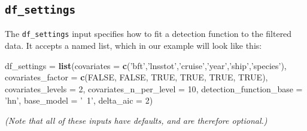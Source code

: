 \documentclass[
]{book}
\newenvironment{Shaded}{\begin{snugshade}}{\end{snugshade}}
\newcommand{\DataTypeTok}[1]{\textcolor[rgb]{0.13,0.29,0.53}{#1}}
\newcommand{\DecValTok}[1]{\textcolor[rgb]{0.00,0.00,0.81}{#1}}
\newcommand{\KeywordTok}[1]{\textcolor[rgb]{0.13,0.29,0.53}{\textbf{#1}}}
\newcommand{\NormalTok}[1]{#1}
\newcommand{\OtherTok}[1]{\textcolor[rgb]{0.56,0.35,0.01}{#1}}
\newcommand{\StringTok}[1]{\textcolor[rgb]{0.31,0.60,0.02}{#1}}
\begin{document}
~

\hypertarget{df_settings}{%
\subsection*{\texorpdfstring{\texttt{df\_settings}}{df\_settings}}\label{df_settings}}

The \texttt{df\_settings} input specifies how to fit a detection function to the filtered data. It accepts a named list, which in our example will look like this:

\begin{Shaded}
\begin{Highlighting}[]
\NormalTok{df_settings =}\StringTok{ }\KeywordTok{list}\NormalTok{(}\DataTypeTok{covariates =} \KeywordTok{c}\NormalTok{(}\StringTok{'bft'}\NormalTok{,}\StringTok{'lnsstot'}\NormalTok{,}\StringTok{'cruise'}\NormalTok{,}\StringTok{'year'}\NormalTok{,}\StringTok{'ship'}\NormalTok{,}\StringTok{'species'}\NormalTok{),}
                   \DataTypeTok{covariates_factor =} \KeywordTok{c}\NormalTok{(}\OtherTok{FALSE}\NormalTok{, }\OtherTok{FALSE}\NormalTok{, }\OtherTok{TRUE}\NormalTok{, }\OtherTok{TRUE}\NormalTok{, }\OtherTok{TRUE}\NormalTok{, }\OtherTok{TRUE}\NormalTok{),}
                   \DataTypeTok{covariates_levels =} \DecValTok{2}\NormalTok{,}
                   \DataTypeTok{covariates_n_per_level =} \DecValTok{10}\NormalTok{,}
                   \DataTypeTok{detection_function_base =} \StringTok{'hn'}\NormalTok{,}
                   \DataTypeTok{base_model =} \StringTok{'~1'}\NormalTok{,}
                   \DataTypeTok{delta_aic =} \DecValTok{2}\NormalTok{)}
\end{Highlighting}
\end{Shaded}

\emph{(Note that all of these inputs have defaults, and are therefore optional.)}
\end{document}
